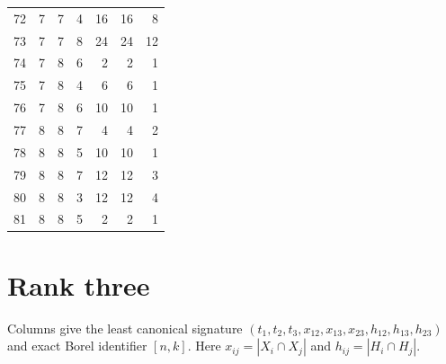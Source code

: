 \documentclass[11pt,a4paper]{article}
\begin{document}
\begin{longtable}{r|rrrr|rr}
72 & 7 & 7 & 4 & 16 & 16 & 8\\
73 & 7 & 7 & 8 & 24 & 24 & 12\\
74 & 7 & 8 & 6 & 2 & 2 & 1\\
75 & 7 & 8 & 4 & 6 & 6 & 1\\
76 & 7 & 8 & 6 & 10 & 10 & 1\\
77 & 8 & 8 & 7 & 4 & 4 & 2\\
78 & 8 & 8 & 5 & 10 & 10 & 1\\
79 & 8 & 8 & 7 & 12 & 12 & 3\\
80 & 8 & 8 & 3 & 12 & 12 & 4\\
81 & 8 & 8 & 5 & 2 & 2 & 1\\
\bottomrule\end{longtable}\normalsize
\section*{Rank three}
Columns give the least canonical signature $(t_1,t_2,t_3,x_{12},x_{13},x_{23},h_{12},h_{13},h_{23})$ and exact Borel identifier $[n,k]$. Here $x_{ij}=|X_i\cap X_j|$ and $h_{ij}=|H_i\cap H_j|$.\small
\end{document}

